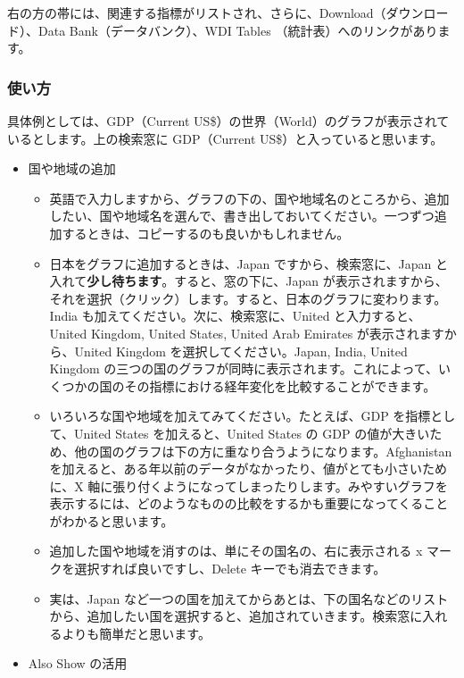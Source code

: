 \documentclass[
  xelatex, ja=standard]{bxjsbook}
\theoremstyle{definition}
\theoremstyle{definition}
\theoremstyle{definition}
\theoremstyle{definition}
\theoremstyle{remark}
\begin{document}
右の方の帯には、関連する指標がリストされ、さらに、Download（ダウンロード）、Data Bank（データバンク）、WDI Tables （統計表）へのリンクがあります。

\hypertarget{ux4f7fux3044ux65b9}{%
\subsubsection{使い方}\label{ux4f7fux3044ux65b9}}

具体例としては、GDP（Current US\$）の世界（World）のグラフが表示されているとします。上の検索窓に GDP（Current US\$）と入っていると思います。

\begin{itemize}
\item
  国や地域の追加

  \begin{itemize}
  \item
    英語で入力しますから、グラフの下の、国や地域名のところから、追加したい、国や地域名を選んで、書き出しておいてください。一つずつ追加するときは、コピーするのも良いかもしれません。
  \item
    日本をグラフに追加するときは、Japan ですから、検索窓に、Japan と入れて\textbf{少し待ちます}。すると、窓の下に、Japan が表示されますから、それを選択（クリック）します。すると、日本のグラフに変わります。India も加えてください。次に、検索窓に、United と入力すると、United Kingdom, United States, United Arab Emirates が表示されますから、United Kingdom を選択してください。Japan, India, United Kingdom の三つの国のグラフが同時に表示されます。これによって、いくつかの国のその指標における経年変化を比較することができます。
  \item
    いろいろな国や地域を加えてみてください。たとえば、GDP を指標として、United States を加えると、United States の GDP の値が大きいため、他の国のグラフは下の方に重なり合うようになります。Afghanistan を加えると、ある年以前のデータがなかったり、値がとても小さいために、X 軸に張り付くようになってしまったりします。みやすいグラフを表示するには、どのようなものの比較をするかも重要になってくることがわかると思います。
  \item
    追加した国や地域を消すのは、単にその国名の、右に表示される x マークを選択すれば良いですし、Delete キーでも消去できます。
  \item
    実は、Japan など一つの国を加えてからあとは、下の国名などのリストから、追加したい国を選択すると、追加されていきます。検索窓に入れるよりも簡単だと思います。
  \end{itemize}
\item
  Also Show の活用


\end{itemize}
\end{document}
